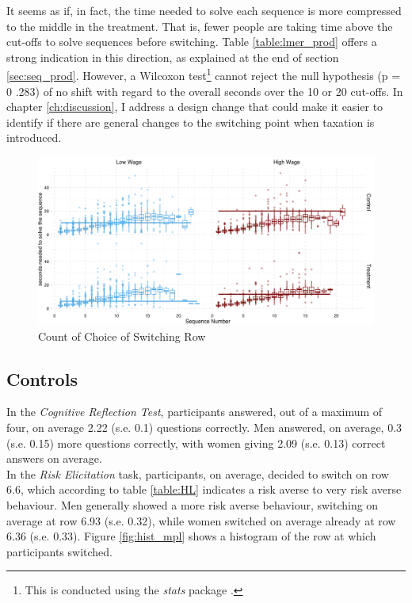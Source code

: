 It seems as if, in fact, the time needed to solve each sequence is more compressed to the middle in the treatment. That is, fewer people are taking time above the cut-offs to solve sequences before switching. Table \ref{table:lmer_prod} offers a strong indication in this direction, as explained at the end of section \ref{sec:seq_prod}. However, a Wilcoxon test\footnote{This is conducted using the \textit{stats} package \cite{rcoreteam2014}.} cannot reject the null hypothesis (p = 0 .283) of no shift with regard to the overall seconds over the 10 or 20 cut-offs. In chapter \ref{ch:discussion}, I address a design change that could make it easier to identify if there are general changes to the switching point when taxation is introduced.\\

\begin{figure}
    \centering
    \includegraphics[width=\textwidth]{graphs/time_task_grid.png}
    \caption{Count of Choice of Switching Row}
    \label{fig:time_per_task}
\end{figure}

\subsection{Controls}

In the \textit{Cognitive Reflection Test}, participants answered, out of a maximum of four, on average 2.22 (s.e. 0.1) questions correctly. Men answered, on average, 0.3 (s.e. 0.15) more questions correctly, with women giving 2.09 (s.e. 0.13) correct answers on average.\\

In the \textit{Risk Elicitation} task, participants, on average, decided to switch on row 6.6, which according to table \ref{table:HL} indicates a risk averse to very risk averse behaviour. Men generally showed a more risk averse behaviour, switching on average at row 6.93 (s.e. 0.32), while women switched on average already at row 6.36 (s.e. 0.33). Figure \ref{fig:hist_mpl} shows a histogram of the row at which participants switched.\\

